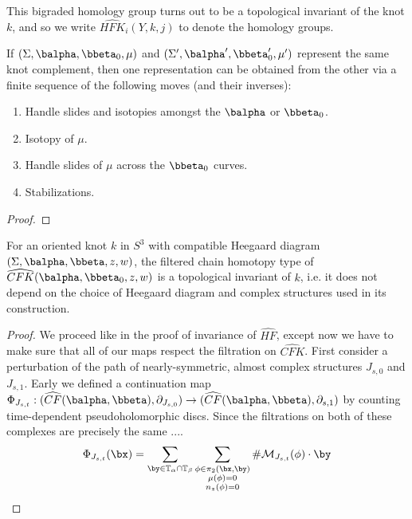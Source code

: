 This bigraded homology group turns out to be a topological invariant of the knot $k$, and so we write $\widehat{HFK}_i(Y,k,j)$ to denote the homology groups.

\begin{prop}
If $(\Sigma,\balpha,\bbeta_0,\mu)$ and $(\Sigma',\balpha',\bbeta_0',\mu')$ represent the same knot complement, then one representation can be obtained from the other via a finite sequence of the following moves (and their inverses):
\begin{enumerate}
	\item Handle slides and isotopies amongst the $\balpha$ or $\bbeta_0$.
	\item Isotopy of $\mu$.
	\item Handle slides of $\mu$ across the $\bbeta_0$ curves.
	\item Stabilizations.
\end{enumerate}
\end{prop}
\begin{proof}

\end{proof}


\begin{thm}
For an oriented knot $k$ in $S^3$ with compatible Heegaard diagram $(\Sigma,\balpha,\bbeta,z,w)$, the filtered chain homotopy type of $\widehat{CFK}(\balpha,\bbeta_0,z,w)$ is a topological invariant of $k$, i.e. it does not depend on the choice of Heegaard diagram and complex structures used in its construction.
\end{thm}
\begin{proof}
We proceed like in the proof of invariance of $\widehat{HF}$, except now we have to make sure that all of our maps respect the filtration on $\widehat{CFK}$. First consider a perturbation of the path of nearly-symmetric, almost complex structures $J_{s,0}$ and $J_{s,1}$. Early we defined a continuation map $\Phi_{J_{s,t}} : (\widehat{CF}(\balpha,\bbeta),\partial_{J_{s,0}}) \rightarrow (\widehat{CF}(\balpha,\bbeta),\partial_{s,1})$ by counting time-dependent pseudoholomorphic discs. Since the filtrations on both of these complexes are precisely the same ....
\[ \Phi_{J_{s,t}}(\bx) = \sum_{\by \in \mathbb T_\alpha \cap \mathbb T_\beta} \sum_{\substack{ \phi \in \pi_2(\bx,\by) \\ \mu(\phi)=0 \\ n_z(\phi)=0}} \# \mathcal M_{J_{s,t}}(\phi) \cdot \by \]

\unfinished

\end{proof}








